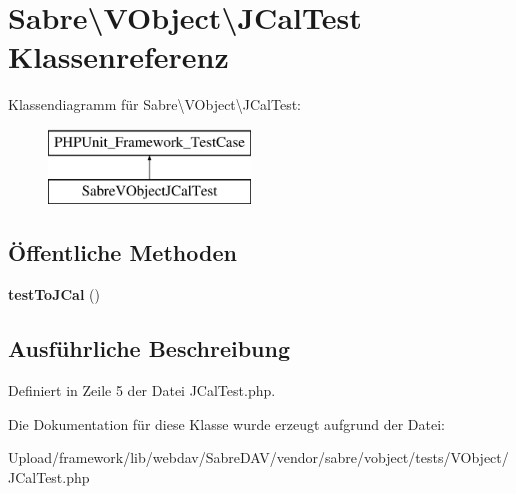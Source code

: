 \hypertarget{class_sabre_1_1_v_object_1_1_j_cal_test}{}\section{Sabre\textbackslash{}V\+Object\textbackslash{}J\+Cal\+Test Klassenreferenz}
\label{class_sabre_1_1_v_object_1_1_j_cal_test}
Klassendiagramm für Sabre\textbackslash{}V\+Object\textbackslash{}J\+Cal\+Test\+:\begin{figure}[H]
\begin{center}
\leavevmode
\includegraphics[height=2.000000cm]{class_sabre_1_1_v_object_1_1_j_cal_test}
\end{center}
\end{figure}
\subsection*{Öffentliche Methoden}
\begin{DoxyCompactItemize}
\item 
\mbox{\label{class_sabre_1_1_v_object_1_1_j_cal_test_ad5a21ed4552be090c478e559cafd48be}} 
{\bfseries test\+To\+J\+Cal} ()
\end{DoxyCompactItemize}


\subsection{Ausführliche Beschreibung}


Definiert in Zeile 5 der Datei J\+Cal\+Test.\+php.



Die Dokumentation für diese Klasse wurde erzeugt aufgrund der Datei\+:\begin{DoxyCompactItemize}
\item 
Upload/framework/lib/webdav/\+Sabre\+D\+A\+V/vendor/sabre/vobject/tests/\+V\+Object/J\+Cal\+Test.\+php\end{DoxyCompactItemize}
